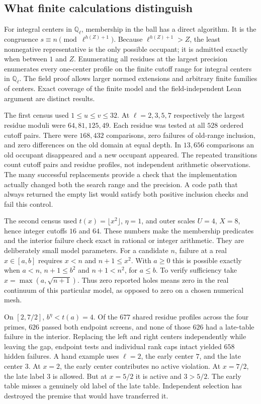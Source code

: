 \documentclass[12pt,letterpaper]{article}
\begin{document}
\subsection{What finite calculations distinguish}

For integral centers in $\mathbb Q_\ell$, membership in the ball has a direct algorithm. It is the congruence $s\equiv n\pmod{\ell^{h(Z)+1}}$. Because $\ell^{h(Z)+1}>Z$, the least nonnegative representative is the only possible occupant; it is admitted exactly when between $1$ and $Z$. Enumerating all residues at the largest precision enumerates every one-center profile on the finite cutoff range for integral centers in $\mathbb Q_\ell$. The field proof allows larger normed extensions and arbitrary finite families of centers. Exact coverage of the finite model and the field-independent Lean argument are distinct results.

The first census used $1\le u\le v\le32$. At $\ell=2,3,5,7$ respectively the largest residue moduli were $64,81,125,49$. Each residue was tested at all $528$ ordered cutoff pairs. There were $168{,}432$ comparisons, zero failures of old-range inclusion, and zero differences on the old domain at equal depth. In $13{,}656$ comparisons an old occupant disappeared and a new occupant appeared. The repeated transitions count cutoff pairs and residue profiles, not independent arithmetic observations. The many successful replacements provide a check that the implementation actually changed both the search range and the precision. A code path that always returned the empty list would satisfy both positive inclusion checks and fail this control.

The second census used $t(x)=\lfloor x^2\rfloor$, $\eta=1$, and outer scales $U=4$, $X=8$, hence integer cutoffs $16$ and $64$. These numbers make the membership predicates and the interior failure check exact in rational or integer arithmetic. They are deliberately small model parameters. For a candidate $n$, failure at a real $x\in[a,b]$ requires $x<n$ and $n+1\le x^2$. With $a\ge0$ this is possible exactly when $a<n$, $n+1\le b^2$ and $n+1<n^2$, for $a\le b$. To verify sufficiency take $x=\max(a,\sqrt{n+1})$. Thus zero reported holes means zero in the real continuum of this particular model, as opposed to zero on a chosen numerical mesh.

On $[2,7/2]$, $b^\eta<t(a)=4$. Of the $677$ shared residue profiles across the four primes, $626$ passed both endpoint screens, and none of those $626$ had a late-table failure in the interior. Replacing the left and right centers independently while leaving the gap, endpoint tests and individual rank caps intact yielded $658$ hidden failures. A hand example uses $\ell=2$, the early center $7$, and the late center $3$. At $x=2$, the early center contributes no active violation. At $x=7/2$, the late label $3$ is allowed. But at $x=5/2$ it is active and $3>5/2$. The early table misses a genuinely old label of the late table. Independent selection has destroyed the premise that would have transferred it.
\end{document}
